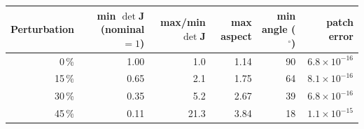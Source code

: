 \begin{tabular}{@{}r r r r r r@{}}
\toprule
Perturbation & min $\det\mathbf J$ (nominal $=1$) & max/min $\det\mathbf J$ & max aspect & min angle ($^\circ$) & patch error \\
\midrule
0\,\% & 1.00 & 1.0 & 1.14 & 90 & $6.8\times10^{-16}$ \\
15\,\% & 0.65 & 2.1 & 1.75 & 64 & $8.1\times10^{-16}$ \\
30\,\% & 0.35 & 5.2 & 2.67 & 39 & $6.8\times10^{-16}$ \\
45\,\% & 0.11 & 21.3 & 3.84 & 18 & $1.1\times10^{-15}$ \\
\bottomrule
\end{tabular}
